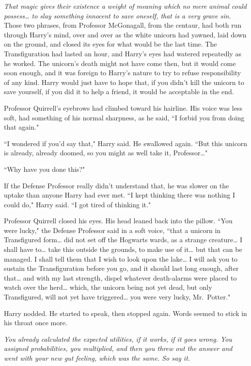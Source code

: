 \emph{That magic gives their existence a weight of meaning which no mere animal could possess{\ldots} to slay something innocent to save oneself, that is a very grave sin.} Those two phrases, from Professor McGonagall, from the centaur, had both run through Harry's mind, over and over as the white unicorn had yawned, laid down on the ground, and closed its eyes for what would be the last time. The Transfiguration had lasted an hour, and Harry's eyes had watered repeatedly as he worked. The unicorn's death might not have come then, but it would come soon enough, and it was foreign to Harry's nature to try to refuse responsibility of any kind. Harry would just have to hope that, if you didn't kill the unicorn to save yourself, if you did it to help a friend, it would be acceptable in the end.

Professor Quirrell's eyebrows had climbed toward his hairline. His voice was less soft, had something of his normal sharpness, as he said, ``I forbid you from doing that again."

``I wondered if you'd say that," Harry said. He swallowed again. ``But this unicorn is already, already doomed, so you might as well take it, Professor{\ldots}"

``Why have you done this?"

If the Defense Professor really didn't understand that, he was slower on the uptake than anyone Harry had ever met. ``I kept thinking there was nothing I could do," Harry said. ``I got tired of thinking it."

Professor Quirrell closed his eyes. His head leaned back into the pillow. ``You were lucky," the Defense Professor said in a soft voice, ``that a unicorn in Transfigured form{\ldots} did not set off the Hogwarts wards, as a strange creature{\ldots} I shall have to{\ldots} take this outside the grounds, to make use of it{\ldots} but that can be managed. I shall tell them that I wish to look upon the lake{\ldots} I will ask you to sustain the Transfiguration before you go, and it should last long enough, after that{\ldots} and with my last strength, dispel whatever death-alarms were placed to watch over the herd{\ldots} which, the unicorn being not yet dead, but only Transfigured, will not yet have triggered{\ldots} you were very lucky, Mr.~Potter."

Harry nodded. He started to speak, then stopped again. Words seemed to stick in his throat once more.

\emph{You already calculated the expected utilities, if it works, if it goes wrong. You assigned probabilities, you multiplied, and then you threw out the answer and went with your new gut feeling, which was the same. So say it.}


